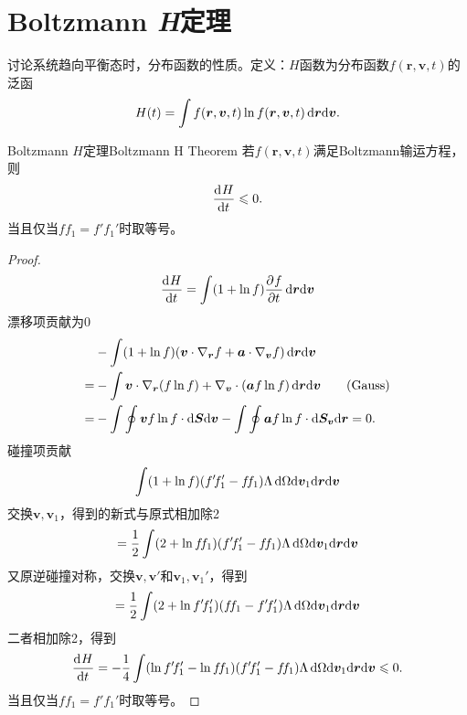 \section{Boltzmann \textit{H}定理}
讨论系统趋向平衡态时，分布函数的性质。定义：$H$函数为分布函数$f(\bm r,\bm v,t)$的泛函
\begin{align}
	H(t)=\int f(\bm r,\bm v,t)\ln f(\bm r,\bm v,t)\mathop{}\!\mathrm{d}\bm r\mathrm{d}\bm v.
\end{align}
\begin{theorem}{Boltzmann $H$定理}{Boltzmann H Theorem}
	若$f(\bm r,\bm v,t)$满足Boltzmann输运方程，则
	\begin{align}
		\frac{\mathrm{d}^{{}}H}{\mathrm{d}{t}^{{}}}\leqslant 0.
	\end{align}
	当且仅当$f\!f_1=f'\!f_1'$时取等号。
\end{theorem}
\begin{proof}
	\begin{align*}
		\frac{\mathrm{d}^{{}}H}{\mathrm{d}{t}^{{}}}=\int(1+\ln f)\frac{\partial^{{}}f}{\partial{t}^{{}}}\mathop{}\!\mathrm{d}\bm r\mathrm{d}\bm v
	\end{align*}
	漂移项贡献为0
	\begin{align*}
		&-\int(1+\ln f)(\bm v\cdot\nabla_{\bm r}f+\bm a\cdot\nabla_{\bm v}f)\mathop{}\!\mathrm{d}\bm r\mathrm{d}\bm v\\
		=&-\int\bm v\cdot\nabla_{\bm r}(f\ln f)+\nabla_{\bm v}\cdot(\bm af\ln f)\mathop{}\!\mathrm{d}\bm r\mathrm{d}\bm v\tag{Gauss}\\
		=&-\int\oint \bm v f\ln f\cdot\mathop{}\!\mathrm{d}\bm S\mathrm{d}\bm v-\int\oint\bm af\ln f\cdot\mathop{}\!\mathrm{d}\bm S_{\bm v}\mathrm{d}\bm r=0.
	\end{align*}
	碰撞项贡献
	\begin{align*}
		\int (1+\ln f)(f'\!f_1'-f\!f_1)\Lambda\mathop{}\!\mathrm{d}\Omega\mathrm{d}\bm v_1\mathrm{d}\bm r\mathrm{d}\bm v
	\end{align*}
	交换$\bm v,\bm v_1$，得到的新式与原式相加除2
	\[
		=\frac12\int (2+\ln f\!f_1)(f'\!f_1'-f\!f_1)\Lambda\mathop{}\!\mathrm{d}\Omega\mathrm{d}\bm v_1\mathrm{d}\bm r\mathrm{d}\bm v
	\]
	又原逆碰撞对称，交换$\bm v,\bm v'$和$\bm v_1,\bm v_1'$，得到
	\[
		=\frac12\int (2+\ln f'\!f_1')(f\!f_1-f'\!f_1')\Lambda\mathop{}\!\mathrm{d}\Omega\mathrm{d}\bm v_1\mathrm{d}\bm r\mathrm{d}\bm v
	\]
	二者相加除2，得到
	\begin{align}
		\frac{\mathrm{d}^{{}}H}{\mathrm{d}{t}^{{}}}=-\frac14\int (\ln f'\!f_1'-\ln f\!f_1)(f'\!f_1'-f\!f_1)\Lambda\mathop{}\!\mathrm{d}\Omega\mathrm{d}\bm v_1\mathrm{d}\bm r\mathrm{d}\bm v\leqslant 0.
	\end{align}
	当且仅当$f\!f_1=f'\!f_1'$时取等号。
\end{proof}

